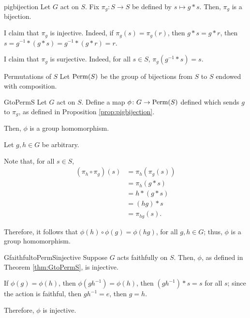 
\begin{prop}{}{pigbijection}
  Let \(G\) act on \(S\). Fix \(\pi_g \colon S \to S\) be defined by \(s \mapsto g * s\). Then, \(\pi_g\) is a bijection.
\end{prop}

\begin{dem}{}{}
  I claim that \(\pi_g\) is injective. Indeed, if \(\pi_g(s) = \pi_g(r)\), then \(g * s = g * r\), then \(s = g^{-1} * (g * s) = g^{-1} * (g * r) = r\).

  I claim that \(\pi_g\) is surjective. Indeed, for all \(s \in S\), \(\pi_g(g^{-1} * s) = s\).
\end{dem}

\begin{defn}{Permutations of \(S\)}{}
  Let \(\operatorname{Perm}(S)\) be the group of bijections from \(S\) to \(S\) endowed with composition.
\end{defn}

\begin{thm}{}{GtoPermS}
  Let \(G\) act on \(S\). Define a map \(\phi \colon G \to \operatorname{Perm}(S)\) defined which sends \(g\) to \(\pi_g\), as defined in Proposition \ref{prop:pigbijection}.

  Then, \(\phi\) is a group homomorphism.
\end{thm}

\begin{dem}{}{}
  Let \(g, h \in G\) be arbitrary.

  Note that, for all \(s \in S\), 
  \begin{align*}
    (\pi_h \circ \pi_g)(s) &= \pi_h(\pi_g(s)) \\
                           &= \pi_h(g * s) \\
                           &= h * (g * s) \\
                           &= (hg) * s \\
                           &= \pi_{hg}(s).
  \end{align*}

  Therefore, it follows that \(\phi(h) \circ \phi(g) = \phi(hg)\), for all \(g, h \in G\); thus, \(\phi\) is a group homomorphism.
\end{dem}

\begin{thm}{}{GfaithfultoPermSinjective}
  Suppose \(G\) acts faithfully on \(S\). Then, \(\phi\), as defined in Theorem \ref{thm:GtoPermS}, is injective.
\end{thm}

\begin{dem}{}{}
  If \(\phi(g) = \phi(h)\), then \(\phi(gh^{-1}) = \phi(h)\), then \((gh^{-1})*s = s\) for all \(s\); since the action is faithful, then  \(gh^{-1} = e\), then \(g = h\).

  Therefore, \(\phi\) is injective.
\end{dem}
